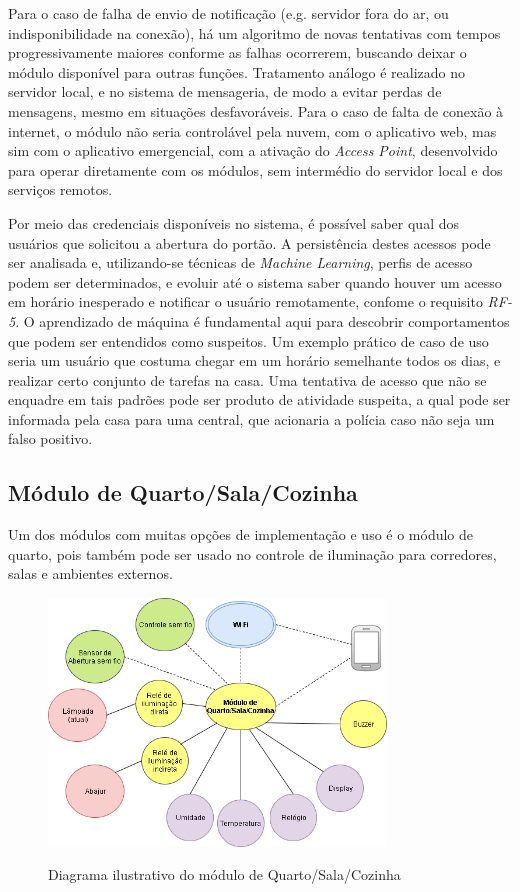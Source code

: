 Para o caso de falha de envio de notificação (e.g. servidor fora do ar, ou indisponibilidade na conexão), há um algoritmo de novas tentativas com tempos progressivamente maiores conforme as falhas ocorrerem, buscando deixar o módulo disponível para outras funções. Tratamento análogo é realizado no servidor local, e no sistema de mensageria, de modo a evitar perdas de mensagens, mesmo em situações desfavoráveis. Para o caso de falta de conexão à internet, o módulo não seria controlável pela nuvem, com o aplicativo web, mas sim com o aplicativo emergencial, com a ativação do \textit{Access Point}, desenvolvido para operar diretamente com os módulos, sem intermédio do servidor local e dos serviços remotos.

Por meio das credenciais disponíveis no sistema, é possível saber qual dos usuários que solicitou a abertura do portão. A persistência destes acessos pode ser analisada e, utilizando-se técnicas de \emph{Machine Learning}, perfis de acesso podem ser determinados, e evoluir até o sistema saber quando houver um acesso em horário inesperado e notificar o usuário remotamente, confome o requisito \emph{RF-5}. O aprendizado de máquina é fundamental aqui para descobrir comportamentos que podem ser entendidos como suspeitos. Um exemplo prático de caso de uso seria um usuário que costuma chegar em um horário semelhante todos os dias, e realizar certo conjunto de tarefas na casa. Uma tentativa de acesso que não se enquadre em tais padrões pode ser produto de atividade suspeita, a qual pode ser informada pela casa para uma central, que acionaria a polícia caso não seja um falso positivo.

\subsection{Módulo de Quarto/Sala/Cozinha}
Um dos módulos com muitas opções de implementação e uso é o módulo de quarto, pois também pode ser usado no controle de iluminação para corredores, salas e ambientes externos.

\begin{figure}[H]
	\centering
	\caption{Diagrama ilustrativo do módulo de Quarto/Sala/Cozinha}
	\includegraphics[width=0.8\textwidth]{diagramaModuloQuarto}
	\label{fig:diagramaModuloQuarto}
\end{figure}

